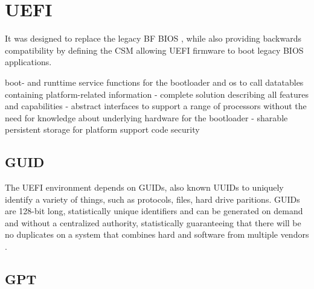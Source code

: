 
\section{\acf{UEFI}}


It was designed to replace the legacy \acl{BF} \ac{BIOS} , while also providing backwards compatibility by defining the \acf{CSM} allowing \ac{UEFI} firmware to boot legacy \ac{BIOS} applications.

boot- and runttime service functions for the bootloader and os to call
datatables containing platform-related information
- complete solution describing all features and capabilities
- abstract interfaces to support a range of processors without the need for knowledge about underlying hardware for the bootloader
- sharable persistent storage for platform support code
security

\cite{beyond-bios}

\subsection{\acf{GUID}}

The \ac{UEFI} environment depends on \acp{GUID}, also known \acp{UUID} to uniquely identify a variety of things, such as protocols, files, hard drive paritions.
\acp{GUID} are 128-bit long, statistically unique identifiers and can be generated on demand and without a centralized authority, statistically guaranteeing that there will be no duplicates on a system that combines hard and software from multiple vendors \cite{rfc-4122}.

\subsection{\acf{GPT}}

